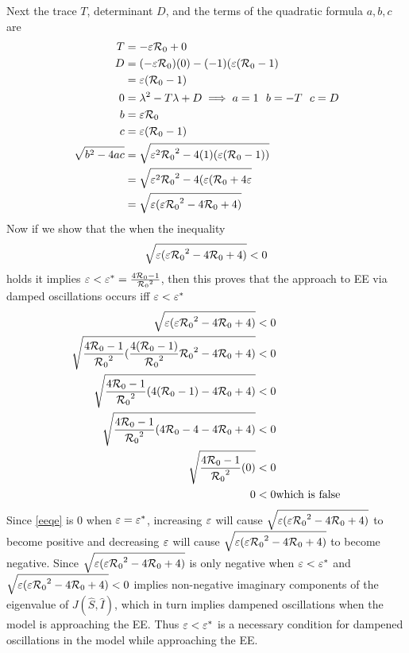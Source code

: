 Next the trace $T$, determinant $D$, and the terms of the quadratic formula $a,b,c$ are
\begin{align}
    T &= -\varepsilon {\mathcal R_0} + 0\\
    D &= (-\varepsilon {\mathcal R_0})(0) - (-1)(\varepsilon({\mathcal R_0}-1)\\
      &= \varepsilon({\mathcal R_0}-1)\\
    0 &= \lambda^2 - T \lambda + D \implies a = 1\ \ b = -T\ \ c = D\\
    b &= \varepsilon {\mathcal R_0}\\
    c &= \varepsilon({\mathcal R_0}-1)\\
    \sqrt{b^2-4ac} &= \sqrt{\varepsilon^2 {\mathcal R_0}^2 - 4(1)(\varepsilon({\mathcal R_0}-1))}\\
                   &= \sqrt{\varepsilon^2 {\mathcal R_0}^2 - 4(\varepsilon({\mathcal R_0}+4\varepsilon}\\
                   &= \sqrt{\varepsilon(\varepsilon{\mathcal R_0}^2 - 4{\mathcal R_0}+4)}\label{bsqr}
\end{align}
Now if we show that the when the inequality
\begin{equation}\label{eqee}
    \sqrt{\varepsilon(\varepsilon{\mathcal R_0}^2 - 4{\mathcal R_0}+4)} < 0
\end{equation}
holds it implies $\varepsilon < \varepsilon^* = \frac{4{\mathcal R_0}-1}{{\mathcal R_0}^2}$, then this proves that the approach to EE via damped oscillations occurs iff $\varepsilon < \varepsilon^*$
\begin{align}
    \sqrt{\varepsilon(\varepsilon{\mathcal R_0}^2 - 4{\mathcal R_0}+4)} &< 0\\
    \sqrt{\frac{4{\mathcal R_0}-1}{{\mathcal R_0}^2}(\frac{4({\mathcal R_0}-1)}{{\mathcal R_0}^2}{\mathcal R_0}^2 - 4{\mathcal R_0}+4)} &< 0\\
    \sqrt{\frac{4{\mathcal R_0}-1}{{\mathcal R_0}^2}(4({\mathcal R_0}-1) - 4{\mathcal R_0}+4)} &< 0\\
    \sqrt{\frac{4{\mathcal R_0}-1}{{\mathcal R_0}^2}(4{\mathcal R_0}-4 - 4{\mathcal R_0}+4)} &< 0\\
    \sqrt{\frac{4{\mathcal R_0}-1}{{\mathcal R_0}^2}(0)} &< 0\\
    0 &< 0 \textrm{which is false}
\end{align}
Since \ref{eeqe} is 0 when $\varepsilon = \varepsilon^*$, increasing $\varepsilon$ will cause $\sqrt{\varepsilon(\varepsilon{\mathcal R_0}^2 - 4{\mathcal R_0}+4)}$ to become positive and decreasing $\varepsilon$ will cause $\sqrt{\varepsilon(\varepsilon{\mathcal R_0}^2 - 4{\mathcal R_0}+4)}$ to become negative.
Since $\sqrt{\varepsilon(\varepsilon{\mathcal R_0}^2 - 4{\mathcal R_0}+4)}$ is only negative when $\varepsilon < \varepsilon^*$ and $\sqrt{\varepsilon(\varepsilon{\mathcal R_0}^2 - 4{\mathcal R_0}+4)} < 0$ implies non-negative imaginary components of the eigenvalue of $J(\hat{S},\hat{I})$, which in turn implies dampened oscillations when the model is approaching the EE.
Thus $\varepsilon < \varepsilon^*$ is a necessary condition for dampened oscillations in the model while approaching the EE.
